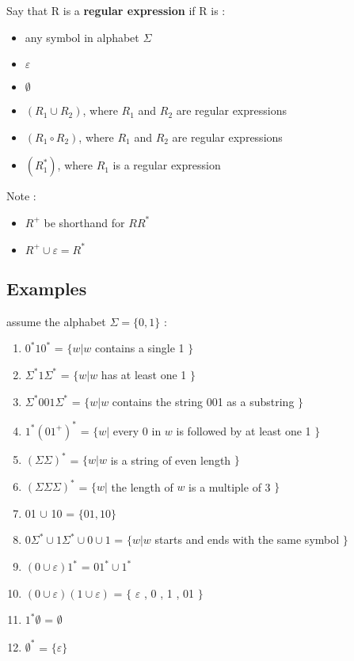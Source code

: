 \documentclass[12pt]{article}
\let\epsilon\varepsilon
\begin{document}
\begin{tcolorbox}
Say that R is a \textbf{regular expression} if R is :
\begin{itemize}
	\item any symbol in alphabet $\Sigma$
	\item $\epsilon$
	\item $\emptyset$
	\item $( R_{1} \cup R_{2} )$, where $R_{1}$ and $R_{2}$ are regular expressions
	\item $( R_{1} \circ R_{2} )$, where $R_{1}$ and $R_{2}$ are regular expressions
	\item $( R_{1}^{*} )$, where $R_{1}$ is a regular expression
\end{itemize}
\end{tcolorbox}


\begin{tcolorbox}
Note :
\begin{itemize}
	\item $R^{+}$ be shorthand for $RR^{*}$
	\item $R^{+} \cup \epsilon = R^{*}$
\end{itemize}
\end{tcolorbox}



\newpage

\subsection{Examples}

assume the alphabet $\Sigma = \{ 0 , 1 \}$ :

\begin{tcolorbox}
\begin{enumerate}
	\item $0^{*}10^{*}$ = $\{ w | w$ contains a single 1 $\}$
	\item $\Sigma^{*}1\Sigma^{*}$ = $\{ w | w$ has at least one 1 $\}$
	\item $\Sigma^{*}001\Sigma^{*}$ = $\{ w | w$ contains the string 001 as a substring $\}$
	\item $1^{*}(01^{+})^{*}$ = $\{ w |$ every 0 in $w$ is followed by at least one 1 $\}$
	\item $(\Sigma \Sigma)^{*}$ = $\{ w | w $ is a string of even length $\}$
	\item $(\Sigma \Sigma \Sigma)^{*}$ = $\{ w |$ the length of $w$ is a multiple of 3 $\}$
	\item 01 $\cup$ 10 = $\{ 01 , 10 \}$
	\item $0\Sigma^{*} \cup 1\Sigma^{*} \cup 0 \cup 1 $ = $\{ w | w$ starts and ends with the same symbol $\}$ 
	\item $( 0 \cup \epsilon ) 1^{*}$ = $01^{*} \cup 1^{*} $
	\item $( 0 \cup \epsilon ) ( 1 \cup \epsilon )$ = $\{$ $\epsilon$ , 0 , 1 , 01 $\}$
	\item $1^{*}\emptyset$ = $\emptyset$
	\item $\emptyset^{*}$ = $\{ \epsilon \}$
\end{enumerate}
\end{tcolorbox}
\end{document}
